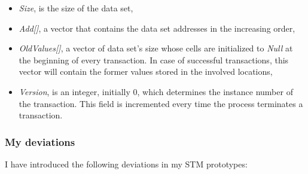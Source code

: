 \documentclass[../main]{subfiles}
\begin{document}
  \begin{itemize}
    \item {\em Size}, is the size of the data set,

    \item {\em Add[]}, a vector that contains the data set addresses in the increasing order,

    \item {\em OldValues[]}, a vector of data set's size whose cells are initialized to {\em Null} at the beginning of every transaction. In case of successful transactions, this vector will contain the former values stored in the involved locations,

    \item {\em Version}, is an integer, initially 0, which determines the instance number of the transaction. This field is incremented every time the process terminates a transaction.

  \end{itemize}

  \subsubsection{My deviations}
  
  \par
  I have introduced the following deviations in my STM prototypes: \par
\end{document}
